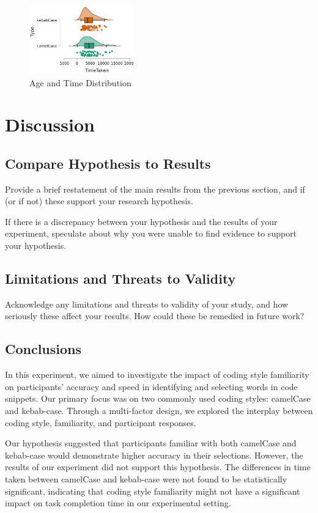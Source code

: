 \documentclass{article}
\begin{document}
\begin{figure}[H]
    \centering
    \includegraphics[width=0.4\textwidth]{difference_type_statistics.png}
    \caption{Age and Time Distribution}
\end{figure}

\section{Discussion}
\subsection{Compare Hypothesis to Results}
Provide a brief restatement of the main results from the previous section, and if (or if not) these support your research hypothesis.

If there is a discrepancy between your hypothesis and the results of your experiment, speculate about why you were unable to find evidence to support your hypothesis.


\subsection{Limitations and Threats to Validity}Acknowledge any limitations and threats to validity of your study, and how seriously these affect your results. How could these be remedied in future work?

\subsection{Conclusions}

In this experiment, we aimed to investigate the impact of coding style familiarity on participants' accuracy and speed in identifying and selecting words in code snippets. Our primary focus was on two commonly used coding styles: camelCase and kebab-case. Through a multi-factor design, we explored the interplay between coding style, familiarity, and participant responses.

Our hypothesis suggested that participants familiar with both camelCase and kebab-case would demonstrate higher accuracy in their selections. However, the results of our experiment did not support this hypothesis. The differences in time taken between camelCase and kebab-case were not found to be statistically significant, indicating that coding style familiarity might not have a significant impact on task completion time in our experimental setting.
\end{document}
